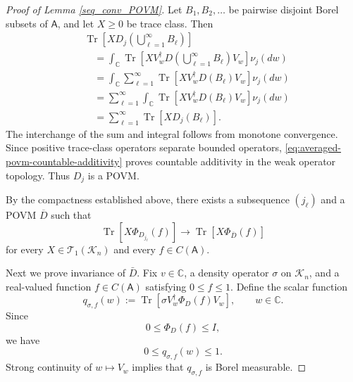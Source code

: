 \documentclass{article}
\theoremstyle{named}
\theoremstyle{named1}
\newcommand{\Tr}{\operatorname{Tr}}
\newcommand{\bbC}{\mathbb C}
\theoremstyle{plain}
\theoremstyle{remark}
\begin{document}
\begin{proof}[Proof of Lemma \ref{seq_conv_POVM}]
Let \(B_1,B_2,\ldots\) be pairwise disjoint Borel subsets of
\(\mathsf A\), and let \(X\geq0\) be trace class. Then
\begin{align}
&
    \Tr\!\left[
        X D_j\!\left(\bigcup_{\ell=1}^\infty B_\ell\right)
    \right]
    \nonumber\\
&\quad=
    \int_{\bbC}
        \Tr\!\left[
            X
            V_w^\dagger
            D\!\left(\bigcup_{\ell=1}^\infty B_\ell\right)
            V_w
        \right]
        \nu_j(dw)
    \nonumber\\
&\quad=
    \int_{\bbC}
        \sum_{\ell=1}^\infty
        \Tr\!\left[
            X V_w^\dagger D(B_\ell)V_w
        \right]
        \nu_j(dw)
    \nonumber\\
&\quad=
    \sum_{\ell=1}^\infty
        \int_{\bbC}
            \Tr\!\left[
                X V_w^\dagger D(B_\ell)V_w
            \right]
            \nu_j(dw)
    \nonumber\\
&\quad=
    \sum_{\ell=1}^\infty
        \Tr[X D_j(B_\ell)].
    \label{eq:averaged-povm-countable-additivity}
\end{align}
The interchange of the sum and integral follows from monotone convergence.
Since positive trace-class operators separate bounded operators,
\eqref{eq:averaged-povm-countable-additivity} proves countable additivity in
the weak operator topology. Thus \(D_j\) is a POVM.

By the compactness established above, there exists a subsequence
\((j_\ell)\) and a POVM \(\overline D\) such that
\begin{equation}
    \Tr\!\left[
        X\Phi_{D_{j_\ell}}(f)
    \right]
    \rightarrow
    \Tr\!\left[
        X\Phi_{\overline D}(f)
    \right]
    \label{eq:averaged-povm-convergence}
\end{equation}
for every \(X\in\mathcal T_1(\mathcal K_n)\) and every
\(f\in C(\mathsf A)\).


Next we prove invariance of $\bar D$. Fix \(v\in\bbC\), a density operator \(\sigma\) on \(\mathcal K_n\), and a
real-valued function \(f\in C(\mathsf A)\) satisfying
$0\leq f\leq1$. Define the scalar function
\begin{equation}
    q_{\sigma,f}(w)
    :=
    \Tr\!\left[
        \sigma
        V_w^\dagger\Phi_D(f)V_w
    \right],
    \qquad
    w\in\bbC.
    \label{eq:scalar-povm-orbit-function}
\end{equation}
Since
\[
    0\leq\Phi_D(f)\leq I,
\]
we have
\begin{equation}
    0\leq q_{\sigma,f}(w)\leq1.
    \label{eq:scalar-orbit-function-range}
\end{equation}
Strong continuity of \(w\mapsto V_w\) implies that
\(q_{\sigma,f}\) is Borel measurable.


\end{proof}
\end{document}
